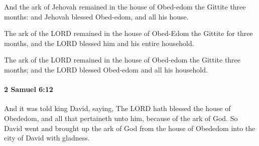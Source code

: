 			\begin{versebox}
					\item[BHS] 
					\item[ASV] And the ark of Jehovah remained in the house of Obed-edom the Gittite three months: and Jehovah blessed Obed-edom, and all his house.
					\item[NIV] The ark of the LORD remained in the house of Obed-Edom the Gittite for three months, and the LORD blessed him and his entire household.
					\item[NRSV] The ark of the LORD remained in the house of Obed-edom the Gittite three months; and the LORD blessed Obed-edom and all his household.
			\end{versebox}

		\paragraph{2 Samuel 6:12} %
			\label{2SAMUEL-6-12}

			And it was told king David, saying, The LORD hath blessed the house of Obededom, and all that pertaineth unto him, because of the ark of God. So David went and brought up the ark of God from the house of Obededom into the city of David with gladness.


